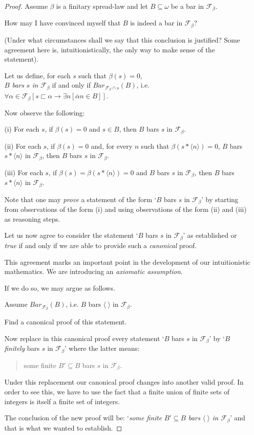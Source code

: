 \documentclass[a4paper]{amsart}
\theoremstyle{plain}
\begin{document}
\begin{proof} Assume $\beta$ is a finitary spread-law and let $B\subseteq \omega$ be a bar in  $\mathcal{F}_\beta$. 

How may I have convinced myself that $B$ is indeed a bar in $\mathcal{F}_\beta$? 

(Under what circumstances shall we say that this conclusion is justified? Some agreement here is, intuitionistically,  the only way to make sense of the statement). 

Let us define, for each $s$ such that $\beta(s)=0$, \\
\emph{$B$ bars $s$ in $\mathcal{F}_\beta$} if and only if $Bar_{\mathcal{F}_\beta\cap s}(B)$, i.e. $\forall \alpha \in \mathcal{F}_\beta[ s\sqsubset \alpha\rightarrow \exists n[\overline \alpha n \in B]]$.  

Now  observe the following:

(i) For each $s$, if $\beta(s) =0$ and $s\in B$, then $B$ bars $s$ in $\mathcal{F}_\beta$.

(ii) For each $s$, if $\beta(s)=0$ and, for every $n$ such that $\beta(s\ast\langle n \rangle)=0$, $B$ bars $s\ast\langle n \rangle$ in $\mathcal{F}_\beta$, then $B$ bars $s$ in $\mathcal{F}_\beta$. 

(iii) For each $s$, if $\beta(s)=\beta(s\ast\langle n \rangle)=0$ and $B$ bars $s$ in $\mathcal{F}_\beta$, then $B$ bars $s\ast\langle n \rangle$ in $\mathcal{F}_\beta$. 

\smallskip 
Note that one may {\it prove} a statement of the form `$B$ bars $s$ in $\mathcal{F}_\beta$' by starting from observations of the form (i) and using observations of the form (ii) and (iii) as reasoning steps.

 Let us now agree to consider the statement `$B$ bars $s$ in $\mathcal{F}_\beta$' as  established or {\it true} if and only if we are able to provide such a {\it canonical} proof. 
 
 \smallskip
  This agreement marks an important point in the development of our intuitionistic mathematics. We are introducing an {\it axiomatic assumption}.
  
\smallskip  If we do so, we may argue as follows. 
 
 Assume $Bar_{\mathcal{F}_\beta}(B)$, i.e. $B$ bars $\langle \; \rangle$ in $\mathcal{F}_\beta$. 
 
 Find a canonical proof of this statement.
 
 Now replace in this canonical proof every statement `$B$ bars $s$ in $\mathcal{F}_\beta$' by `$B$ \emph{finitely} bars $s$ in $\mathcal{F}_\beta$' where the latter means: \begin{quote} some finite $B'\subseteq B$ bars $s$ in $\mathcal{F}_\beta$. \end{quote}
 
 Under this replacement our canonical proof changes into another valid proof. In order to see this, we have to use the fact that a finite union of finite sets of integers is itself a finite set of integers.
 
 The conclusion of the new proof will be: `\emph{some finite $B'\subseteq B$ bars $\langle\;\rangle$ in $\mathcal{F}_\beta$}' and that is what we wanted to establish. 
\end{proof}
\end{document}
